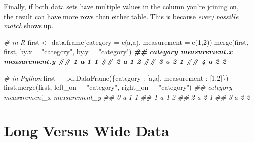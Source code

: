 \documentclass[
  12pt,
  krantz2]{krantz}
\makeatletter
\newenvironment{Shaded}{\begin{snugshade}}{\end{snugshade}}
\newcommand{\AttributeTok}[1]{\textcolor[rgb]{0.61,0.61,0.61}{#1}}
\newcommand{\CommentTok}[1]{\textcolor[rgb]{0.37,0.37,0.37}{\textit{#1}}}
\newcommand{\DecValTok}[1]{\textcolor[rgb]{0.06,0.06,0.06}{#1}}
\newcommand{\DocumentationTok}[1]{\textcolor[rgb]{0.37,0.37,0.37}{\textbf{\textit{#1}}}}
\newcommand{\FunctionTok}[1]{\textcolor[rgb]{0,0,0}{#1}}
\newcommand{\NormalTok}[1]{#1}
\newcommand{\OperatorTok}[1]{\textcolor[rgb]{0.43,0.43,0.43}{\textbf{#1}}}
\newcommand{\OtherTok}[1]{\textcolor[rgb]{0.37,0.37,0.37}{#1}}
\newcommand{\StringTok}[1]{\textcolor[rgb]{0.5,0.5,0.5}{#1}}
\newenvironment{kframe}{%
\medskip{}
\setlength{\fboxsep}{.8em}
 \def\at@end@of@kframe{}%
 \ifinner\ifhmode%
  \def\at@end@of@kframe{\end{minipage}}%
  \begin{minipage}{\columnwidth}%
 \fi\fi%
 \def\FrameCommand##1{\hskip\@totalleftmargin \hskip-\fboxsep
 \colorbox{shadecolor}{##1}\hskip-\fboxsep
     \hskip-\linewidth \hskip-\@totalleftmargin \hskip\columnwidth}%
 \MakeFramed {\advance\hsize-\width
   \@totalleftmargin\z@ \linewidth\hsize
   \@setminipage}}%
 {\par\unskip\endMakeFramed%
 \at@end@of@kframe}
\renewenvironment{Shaded}{\begin{kframe}}{\end{kframe}}
\makeatother
\begin{document}
Finally, if both data sets have multiple values in the column you're joining on, the result can have more rows than either table. This is because \emph{every possible match} shows up.

\begin{Shaded}
\begin{Highlighting}[]
\CommentTok{\# in R}
\NormalTok{first }\OtherTok{\textless{}{-}} \FunctionTok{data.frame}\NormalTok{(}\AttributeTok{category =} \FunctionTok{c}\NormalTok{(}\StringTok{\textquotesingle{}a\textquotesingle{}}\NormalTok{,}\StringTok{\textquotesingle{}a\textquotesingle{}}\NormalTok{), }\AttributeTok{measurement =} \FunctionTok{c}\NormalTok{(}\DecValTok{1}\NormalTok{,}\DecValTok{2}\NormalTok{))}
\FunctionTok{merge}\NormalTok{(first, first, }\AttributeTok{by.x =} \StringTok{"category"}\NormalTok{, }\AttributeTok{by.y =} \StringTok{"category"}\NormalTok{)}
\DocumentationTok{\#\#   category measurement.x measurement.y}
\DocumentationTok{\#\# 1        a             1             1}
\DocumentationTok{\#\# 2        a             1             2}
\DocumentationTok{\#\# 3        a             2             1}
\DocumentationTok{\#\# 4        a             2             2}
\end{Highlighting}
\end{Shaded}

\begin{Shaded}
\begin{Highlighting}[]
\CommentTok{\# in Python}
\NormalTok{first }\OperatorTok{=}\NormalTok{ pd.DataFrame(\{}\StringTok{\textquotesingle{}category\textquotesingle{}}\NormalTok{ : [}\StringTok{\textquotesingle{}a\textquotesingle{}}\NormalTok{,}\StringTok{\textquotesingle{}a\textquotesingle{}}\NormalTok{], }\StringTok{\textquotesingle{}measurement\textquotesingle{}}\NormalTok{ : [}\DecValTok{1}\NormalTok{,}\DecValTok{2}\NormalTok{]\})}
\NormalTok{first.merge(first, left\_on }\OperatorTok{=} \StringTok{"category"}\NormalTok{, right\_on }\OperatorTok{=} \StringTok{"category"}\NormalTok{)}
\CommentTok{\#\#   category  measurement\_x  measurement\_y}
\CommentTok{\#\# 0        a              1              1}
\CommentTok{\#\# 1        a              1              2}
\CommentTok{\#\# 2        a              2              1}
\CommentTok{\#\# 3        a              2              2}
\end{Highlighting}
\end{Shaded}

\hypertarget{long-versus-wide-data}{%
\section{Long Versus Wide Data}\label{long-versus-wide-data}}
\end{document}
